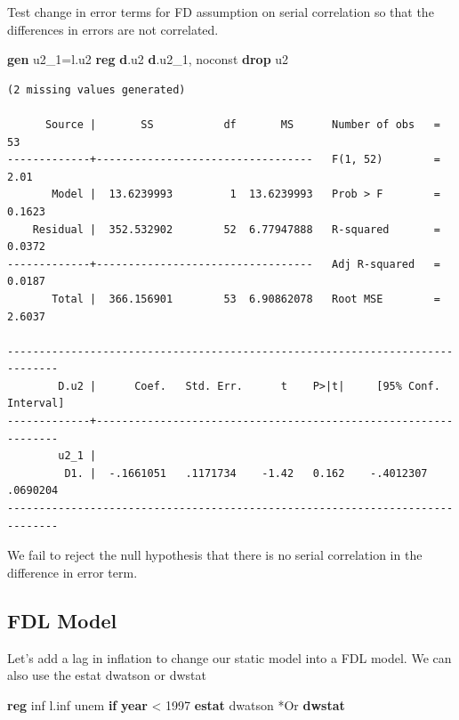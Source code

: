 \documentclass[
]{book}
\newenvironment{Shaded}{\begin{snugshade}}{\end{snugshade}}
\newcommand{\FunctionTok}[1]{\textcolor[rgb]{0.13,0.29,0.53}{\textbf{#1}}}
\newcommand{\KeywordTok}[1]{\textcolor[rgb]{0.13,0.29,0.53}{\textbf{#1}}}
\newcommand{\NormalTok}[1]{#1}
\newcommand{\OtherTok}[1]{\textcolor[rgb]{0.56,0.35,0.01}{#1}}
\begin{document}
Test change in error terms for FD assumption on serial correlation so that
the differences in errors are not correlated.

\begin{Shaded}
\begin{Highlighting}[]
\KeywordTok{gen}\NormalTok{ u2\_1=}\OtherTok{l}\NormalTok{.u2}
\KeywordTok{reg} \KeywordTok{d}\NormalTok{.u2 }\KeywordTok{d}\NormalTok{.u2\_1, noconst}
\KeywordTok{drop}\NormalTok{ u2}
\end{Highlighting}
\end{Shaded}

\begin{verbatim}
(2 missing values generated)

      Source |       SS           df       MS      Number of obs   =        53
-------------+----------------------------------   F(1, 52)        =      2.01
       Model |  13.6239993         1  13.6239993   Prob > F        =    0.1623
    Residual |  352.532902        52  6.77947888   R-squared       =    0.0372
-------------+----------------------------------   Adj R-squared   =    0.0187
       Total |  366.156901        53  6.90862078   Root MSE        =    2.6037

------------------------------------------------------------------------------
        D.u2 |      Coef.   Std. Err.      t    P>|t|     [95% Conf. Interval]
-------------+----------------------------------------------------------------
        u2_1 |
         D1. |  -.1661051   .1171734    -1.42   0.162    -.4012307    .0690204
------------------------------------------------------------------------------
\end{verbatim}

We fail to reject the null hypothesis that there is no serial correlation in
the difference in error term.

\subsection*{FDL Model}\label{fdl-model}

Let's add a lag in inflation to change our static model into a FDL model.
We can also use the estat dwatson or dwstat

\begin{Shaded}
\begin{Highlighting}[]
\KeywordTok{reg}\NormalTok{ inf }\OtherTok{l}\NormalTok{.inf unem }\KeywordTok{if} \FunctionTok{year}\NormalTok{ \textless{} 1997}
\KeywordTok{estat}\NormalTok{ dwatson}
\NormalTok{*Or}
\KeywordTok{dwstat}
\end{Highlighting}
\end{Shaded}
\end{document}
